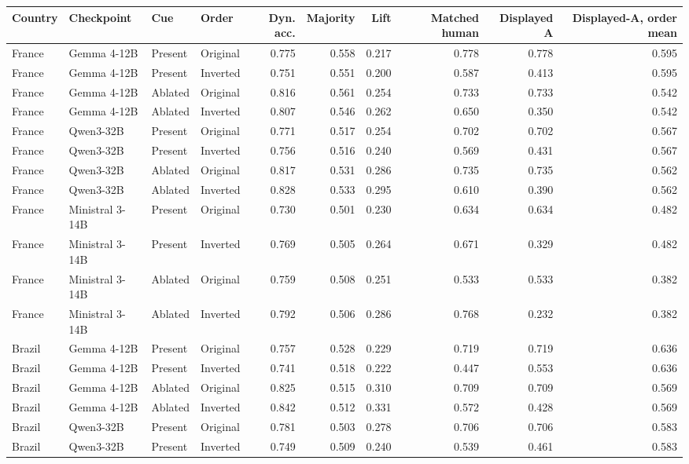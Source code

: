 \begin{tabular}{llllrrrrrr}
\toprule
Country & Checkpoint & Cue & Order & Dyn. acc. & Majority & Lift & Matched human & Displayed A & Displayed-A, order mean \\
\midrule
France & Gemma 4-12B & Present & Original & 0.775 & 0.558 & 0.217 & 0.778 & 0.778 & 0.595 \\
France & Gemma 4-12B & Present & Inverted & 0.751 & 0.551 & 0.200 & 0.587 & 0.413 & 0.595 \\
France & Gemma 4-12B & Ablated & Original & 0.816 & 0.561 & 0.254 & 0.733 & 0.733 & 0.542 \\
France & Gemma 4-12B & Ablated & Inverted & 0.807 & 0.546 & 0.262 & 0.650 & 0.350 & 0.542 \\
France & Qwen3-32B & Present & Original & 0.771 & 0.517 & 0.254 & 0.702 & 0.702 & 0.567 \\
France & Qwen3-32B & Present & Inverted & 0.756 & 0.516 & 0.240 & 0.569 & 0.431 & 0.567 \\
France & Qwen3-32B & Ablated & Original & 0.817 & 0.531 & 0.286 & 0.735 & 0.735 & 0.562 \\
France & Qwen3-32B & Ablated & Inverted & 0.828 & 0.533 & 0.295 & 0.610 & 0.390 & 0.562 \\
France & Ministral 3-14B & Present & Original & 0.730 & 0.501 & 0.230 & 0.634 & 0.634 & 0.482 \\
France & Ministral 3-14B & Present & Inverted & 0.769 & 0.505 & 0.264 & 0.671 & 0.329 & 0.482 \\
France & Ministral 3-14B & Ablated & Original & 0.759 & 0.508 & 0.251 & 0.533 & 0.533 & 0.382 \\
France & Ministral 3-14B & Ablated & Inverted & 0.792 & 0.506 & 0.286 & 0.768 & 0.232 & 0.382 \\
\addlinespace
Brazil & Gemma 4-12B & Present & Original & 0.757 & 0.528 & 0.229 & 0.719 & 0.719 & 0.636 \\
Brazil & Gemma 4-12B & Present & Inverted & 0.741 & 0.518 & 0.222 & 0.447 & 0.553 & 0.636 \\
Brazil & Gemma 4-12B & Ablated & Original & 0.825 & 0.515 & 0.310 & 0.709 & 0.709 & 0.569 \\
Brazil & Gemma 4-12B & Ablated & Inverted & 0.842 & 0.512 & 0.331 & 0.572 & 0.428 & 0.569 \\
Brazil & Qwen3-32B & Present & Original & 0.781 & 0.503 & 0.278 & 0.706 & 0.706 & 0.583 \\
Brazil & Qwen3-32B & Present & Inverted & 0.749 & 0.509 & 0.240 & 0.539 & 0.461 & 0.583 \\

\end{tabular}
